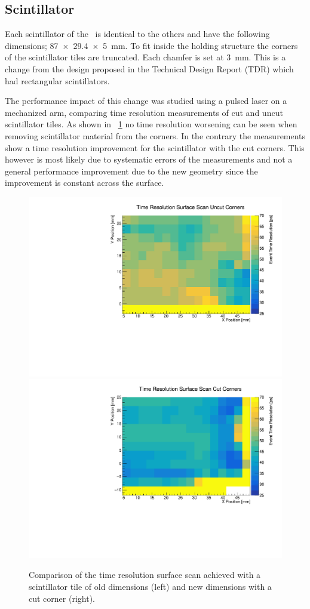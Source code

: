 \documentclass[../BTOF_summary.tex]{subfiles}
\begin{document}
\subsection{Scintillator}
Each scintillator of the \btofD\ is identical to the others and have the following dimensions; \SI{87 x 29.4 x 5}{mm}.
To fit inside the holding structure the corners of the scintillator tiles are truncated.
Each chamfer is set at \SI{3}{mm}.
This is a change from the design proposed in the Technical Design Report (TDR) which had rectangular scintillators.

The performance impact of this change was studied using a pulsed laser on a mechanized arm, comparing time resolution measurements of cut and uncut scintillator tiles.
As shown in \fig~\ref{fig:Surface_Scan_cutUncut} no time resolution worsening can be seen when removing scintillator material from the corners.
In the contrary the measurements show a time resolution improvement for the scintillator with the cut corners.
This however is most likely due to systematic errors of the measurements and not a general performance improvement due to the new geometry since the improvement is constant across the surface.

\begin{figure}[htpb]
	\centering
	\includegraphics[width=.49\textwidth]{fig/Time_Resolution_Surface_Scan_Uncut_Corners.pdf}
	\includegraphics[width=.49\textwidth]{fig/Time_Resolution_Surface_Scan_Cut_Corners.pdf}
	\caption{Comparison of the time resolution surface scan achieved with a scintillator tile of old dimensions (left) and new dimensions with a cut corner (right).}
	\label{fig:Surface_Scan_cutUncut}
\end{figure}
\end{document}

